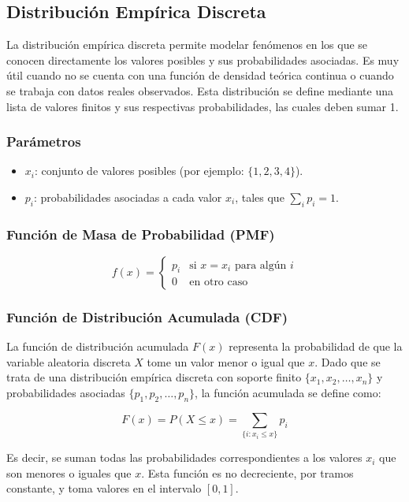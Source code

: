 \documentclass{article}
\begin{document}
\subsection{Distribución Empírica Discreta}

La distribución empírica discreta permite modelar fenómenos en los que se conocen directamente los valores posibles y sus probabilidades asociadas. Es muy útil cuando no se cuenta con una función de densidad teórica continua o cuando se trabaja con datos reales observados. Esta distribución se define mediante una lista de valores finitos y sus respectivas probabilidades, las cuales deben sumar 1.

\subsubsection*{Parámetros}
\begin{itemize}
    \item $x_i$: conjunto de valores posibles (por ejemplo: $\{1, 2, 3, 4\}$).
    \item $p_i$: probabilidades asociadas a cada valor $x_i$, tales que $\sum_i p_i = 1$.
\end{itemize}

\subsubsection*{Función de Masa de Probabilidad (PMF)}

\[
f(x) =
\begin{cases}
p_i & \text{si } x = x_i \text{ para algún } i \\
0   & \text{en otro caso}
\end{cases}
\]

\subsubsection*{Función de Distribución Acumulada (CDF)}

La función de distribución acumulada $F(x)$ representa la probabilidad de que la variable aleatoria discreta $X$ tome un valor menor o igual que $x$. Dado que se trata de una distribución empírica discreta con soporte finito $\{x_1, x_2, \dots, x_n\}$ y probabilidades asociadas $\{p_1, p_2, \dots, p_n\}$, la función acumulada se define como:

\[
F(x) = P(X \leq x) = \sum_{\{i: x_i \leq x\}} p_i
\]

Es decir, se suman todas las probabilidades correspondientes a los valores $x_i$ que son menores o iguales que $x$. Esta función es no decreciente, por tramos constante, y toma valores en el intervalo $[0, 1]$.
\end{document}
